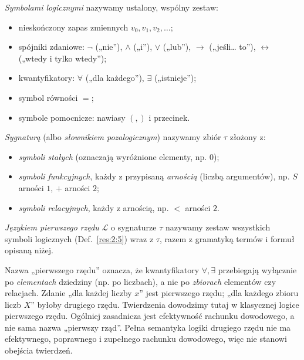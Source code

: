\begin{definicja}\label{res:2:5}
\emph{Symbolami logicznymi} nazywamy ustalony, wspólny zestaw:
\begin{itemize}
\item nieskończony zapas zmiennych $v_0,v_1,v_2,\ldots$;
\item spójniki zdaniowe: $\neg$ („nie”), $\land$ („i”), $\lor$ („lub”), $\to$ („jeśli\ldots{} to”), $\leftrightarrow$ („wtedy i tylko wtedy”);
\item kwantyfikatory: $\forall$ („dla każdego”), $\exists$ („istnieje”);
\item symbol równości $=$;
\item symbole pomocnicze: nawiasy $(,)$ i przecinek.
\end{itemize}
\end{definicja}

\begin{definicja}\label{res:2:6}
\emph{Sygnaturą} (albo \emph{słownikiem pozalogicznym}) nazywamy zbiór $\tau$ złożony z:
\begin{itemize}
\item \emph{symboli stałych} (oznaczają wyróżnione elementy, np. $0$);
\item \emph{symboli funkcyjnych}, każdy z przypisaną \emph{arnością} (liczbą argumentów), np. $S$ arności $1$, $+$ arności $2$;
\item \emph{symboli relacyjnych}, każdy z arnością, np. $<$ arności $2$.
\end{itemize}
\emph{Językiem pierwszego rzędu} $\mathcal L$ o sygnaturze $\tau$ nazywamy zestaw wszystkich symboli logicznych (Def.~\ref{res:2:5}) wraz z $\tau$, razem z gramatyką termów i formuł opisaną niżej.
\end{definicja}

\begin{uwaga}\label{res:2:7}
Nazwa „pierwszego rzędu” oznacza, że kwantyfikatory $\forall,\exists$ przebiegają wyłącznie po \emph{elementach} dziedziny (np. po liczbach), a nie po \emph{zbiorach} elementów czy relacjach. Zdanie „dla każdej liczby $x$” jest pierwszego rzędu; „dla każdego zbioru liczb $X$” byłoby drugiego rzędu. Twierdzenia dowodzimy tutaj w klasycznej logice pierwszego rzędu. Ogólniej zasadnicza jest efektywność rachunku dowodowego, a nie sama nazwa „pierwszy rząd”. Pełna semantyka logiki drugiego rzędu nie ma efektywnego, poprawnego i zupełnego rachunku dowodowego, więc nie stanowi obejścia twierdzeń.
\end{uwaga}

